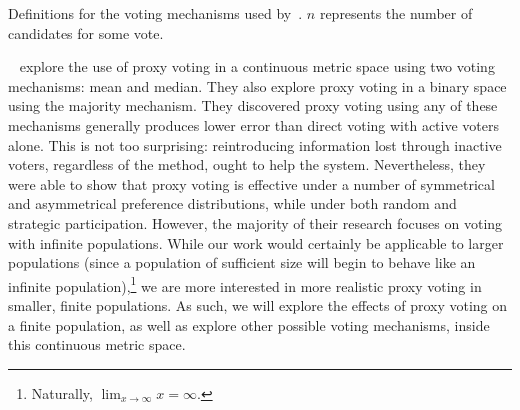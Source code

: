 \begin{table}[htbp]
    \renewcommand{\arraystretch}{1.3}

    \caption{
        Definitions for the voting mechanisms used by~\cite{Mathur2017}.
        $n$ represents the number of candidates for some vote.
    }
    \label{tab:mathur-voting-mechanisms}

    \centering
    
\end{table}
%

~\cite{Cohensius2017} explore the use of proxy voting in a
continuous metric space using two voting mechanisms: mean and median.
They also explore proxy voting in a binary space using the majority mechanism.
They discovered proxy voting using any of these mechanisms generally produces lower
error than direct voting with active voters alone.
This is not too surprising: reintroducing information lost through inactive voters,
regardless of the method, ought to help the system.
Nevertheless, they were able to show that proxy voting is effective under a number of
symmetrical and asymmetrical preference distributions, while under both random and
strategic participation.
However, the majority of their research focuses on voting with infinite populations.
While our work would certainly be applicable to larger populations (since a
population of sufficient size will begin to behave like an infinite population),\footnote{
    Naturally, $\lim_{x \rightarrow \infty} x = \infty$.
} we are more interested in more realistic proxy voting in smaller, finite populations.
As such, we will explore the effects of proxy voting on a finite population, as well
as explore other possible voting mechanisms, inside this continuous metric space.

